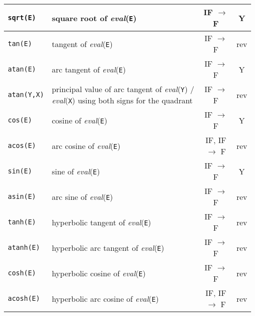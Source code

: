 \begin{supertabular}{|l|L{7.5cm}|c|c|}
\hline

\texttt{sqrt(E)} & square root of \textit{eval}(\texttt{E}) & IF
$\rightarrow$ F & Y \\

\hline

\texttt{tan(E)} & tangent of \textit{eval}(\texttt{E}) & IF
$\rightarrow$ F & rev \\

\hline

\texttt{atan(E)} & arc tangent of \textit{eval}(\texttt{E}) & IF
$\rightarrow$ F & Y \\

\hline

\texttt{atan(Y,X)} & principal value of arc tangent
of \textit{eval}(\texttt{Y}) / \textit{eval}(\texttt{X}) using both signs for the quadrant & IF
$\rightarrow$ F & rev \\

\hline

\texttt{cos(E)} & cosine of \textit{eval}(\texttt{E}) & IF $\rightarrow$ F &
Y \\

\hline

\texttt{acos(E)} & arc cosine of \textit{eval}(\texttt{E}) & IF, IF $\rightarrow$ F &
rev \\

\hline

\texttt{sin(E)} & sine of \textit{eval}(\texttt{E}) & IF $\rightarrow$ F & Y \\

\hline

\texttt{asin(E)} & arc sine of \textit{eval}(\texttt{E}) & IF $\rightarrow$ F & rev \\

\hline

\texttt{tanh(E)} & hyperbolic tangent of \textit{eval}(\texttt{E}) & IF
$\rightarrow$ F & rev \\

\hline

\texttt{atanh(E)} & hyperbolic arc tangent of \textit{eval}(\texttt{E}) & IF
$\rightarrow$ F & rev \\

\hline

\texttt{cosh(E)} & hyperbolic cosine of \textit{eval}(\texttt{E}) & IF $\rightarrow$ F &
rev \\

\hline

\texttt{acosh(E)} & hyperbolic arc cosine of \textit{eval}(\texttt{E}) & IF, IF $\rightarrow$ F &
rev \\


\end{supertabular}
